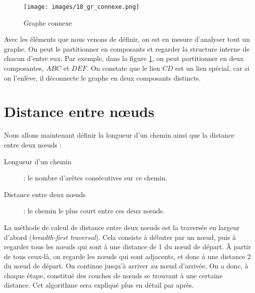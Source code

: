     \vspace{1ex}
    
	\begin{figure}[!h]
	\center
	\texttt{[image: images/18\_gr\_connexe.png]}
	\caption{\label{gr_connexe} Graphe connexe}
	\end{figure}
	
	Avec les éléments que nous venons de définir, on est en mesure d'analyser tout un graphe. On peut le partitionner en composants et regarder la structure interne de chacun d'entre eux. Par exemple, dans la figure \ref{gr_connexe}, on peut partitionner en deux composantes, $ABC$ et $DEF$. On constate que le lien $CD$ est un lien spécial, car si on l'enlève, il déconnecte le graphe en deux composants distincts.

	

\section{Distance entre n\oe uds}
Nous allons maintenant définir la longueur d'un chemin ainsi que la distance entre deux n\oe uds :
\begin{description}
\item[Longueur d'un chemin] : le nombre d'arêtes consécutives sur ce chemin.
\item [Distance entre deux n\oe uds] : le chemin le plus court entre ces deux n\oe uds.
\end{description}

La méthode de calcul de distance entre deux n\oe uds est la traversée en largeur d'abord (\emph{breadth-first traversal}). Cela consiste à débuter par un n\oe ud, puis à regarder tous les n\oe uds qui sont à une distance de 1 du n\oe ud de départ. À partir de tous ceux-là, on regarde les n\oe uds qui sont adjacents, et donc à une distance 2 du n\oe ud de départ. On continue jusqu'à arriver au n\oe ud d'arrivée. On a donc, à chaque étape, constitué des couches de n\oe uds se trouvant à une certaine distance. Cet algorithme sera expliqué plus en détail par après.

